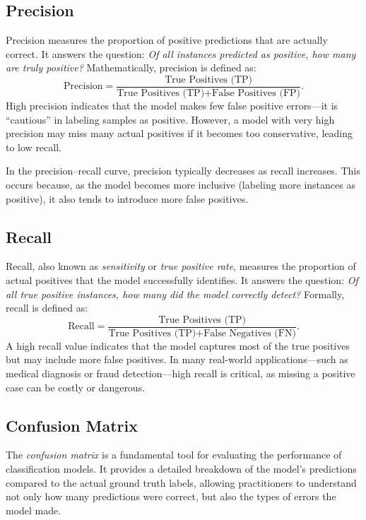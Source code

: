 \documentclass[12pt,a4paper]{report}
\begin{document}
\vspace{1em}
\subsection{Precision}

Precision measures the proportion of positive predictions that are actually correct. 
It answers the question: \textit{Of all instances predicted as positive, how many are truly positive?} 
Mathematically, precision is defined as:
\[
\text{Precision} = \frac{\text{True Positives (TP)}}{\text{True Positives (TP)} + \text{False Positives (FP)}}.
\]
High precision indicates that the model makes few false positive errors—it is “cautious” in labeling samples as positive.  
However, a model with very high precision may miss many actual positives if it becomes too conservative, leading to low recall.

\vspace{0.5em}
In the precision–recall curve, precision typically decreases as recall increases. 
This occurs because, as the model becomes more inclusive (labeling more instances as positive), it also tends to introduce more false positives.

\vspace{1em}
\subsection{Recall}

Recall, also known as \textit{sensitivity} or \textit{true positive rate}, measures the proportion of actual positives that the model successfully identifies. 
It answers the question: \textit{Of all true positive instances, how many did the model correctly detect?} 
Formally, recall is defined as:
\[
\text{Recall} = \frac{\text{True Positives (TP)}}{\text{True Positives (TP)} + \text{False Negatives (FN)}}.
\]
A high recall value indicates that the model captures most of the true positives but may include more false positives.  
In many real-world applications—such as medical diagnosis or fraud detection—high recall is critical, as missing a positive case can be costly or dangerous.

\vspace{1em}
\subsection{Confusion Matrix}

The \textit{confusion matrix} is a fundamental tool for evaluating the performance of classification models. 
It provides a detailed breakdown of the model’s predictions compared to the actual ground truth labels, allowing practitioners to understand not only how many predictions were correct, but also the types of errors the model made.
\end{document}
